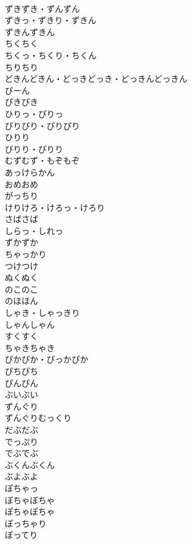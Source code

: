 \documentclass[8pt]{extreport}
\begin{document}
\begin{CJK}{UTF8}{min}
\\	ずきずき・ずんずん	
\\	ずきっ・ずきり・ずきん	
\\	ずきんずきん	
\\	ちくちく	
\\	ちくっ・ちくり・ちくん	
\\	ちりちり	
\\	どきんどきん・どっきどっき・どっきんどっきん	
\\	びーん	
\\	ぴきぴき	
\\	ひりっ・ぴりっ	
\\	びりびり・ぴりぴり	
\\	ひりり	
\\	びりり・ぴりり	
\\	むずむず・もぞもぞ	
\\	あっけらかん	
\\	おめおめ	
\\	がっちり	
\\	けりけろ・けろっ・けろり	
\\	さばさば	
\\	しらっ・しれっ	
\\	ずかずか	
\\	ちゃっかり	
\\	つけつけ	
\\	ぬくぬく	
\\	のこのこ	
\\	のほほん	
\\	しゃき・しゃっきり	
\\	しゃんしゃん	
\\	すくすく	
\\	ちゃきちゃき	
\\	ぴかぴか・ぴっかぴか	
\\	ぴちぴち	
\\	ぴんぴん	
\\	ぶいぶい	
\\	ずんぐり	
\\	ずんぐりむっくり	
\\	だぶだぶ	
\\	でっぷり	
\\	でぶでぶ	
\\	ぶくんぶくん	
\\	ぶよぶよ	
\\	ぽちゃっ	
\\	ぼちゃぼちゃ	
\\	ぽちゃぽちゃ	
\\	ぽっちゃり	
\\	ぼってり	

\end{CJK}
\end{document}
